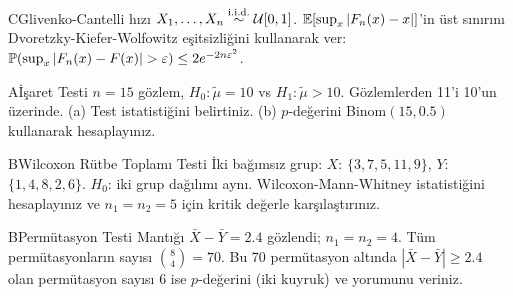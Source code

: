 \begin{alistirma}[Al.17.5]{C}{Glivenko-Cantelli hızı}
$X_1,\ldots,X_n\overset{\text{i.i.d.}}{\sim}\mathcal{U}[0,1]$. $\mathbb{E}[\sup_x|F_n(x)-x|]$'in üst sınırını Dvoretzky-Kiefer-Wolfowitz eşitsizliğini kullanarak ver: $\Prob(\sup_x|F_n(x)-F(x)|>\varepsilon)\leq 2e^{-2n\varepsilon^2}$.
\end{alistirma}

\begin{alistirma}[Al.17.9]{A}{İşaret Testi}
$n=15$ gözlem, $H_0:\tilde\mu=10$ vs $H_1:\tilde\mu>10$. Gözlemlerden 11'i 10'un üzerinde. (a) Test istatistiğini belirtiniz. (b) $p$-değerini Binom$(15,0.5)$ kullanarak hesaplayınız.
\end{alistirma}

\begin{alistirma}[Al.17.10]{B}{Wilcoxon Rütbe Toplamı Testi}
İki bağımsız grup: $X$: $\{3,7,5,11,9\}$, $Y$: $\{1,4,8,2,6\}$. $H_0$: iki grup dağılımı aynı. Wilcoxon-Mann-Whitney istatistiğini hesaplayınız ve $n_1=n_2=5$ için kritik değerle karşılaştırınız.
\end{alistirma}

\begin{alistirma}[Al.17.11]{B}{Permütasyon Testi Mantığı}
$\bar X-\bar Y=2.4$ gözlendi; $n_1=n_2=4$. Tüm permütasyonların sayısı $\binom{8}{4}=70$. Bu 70 permütasyon altında $|\bar X-\bar Y|\geq2.4$ olan permütasyon sayısı 6 ise $p$-değerini (iki kuyruk) ve yorumunu veriniz.
\end{alistirma}

